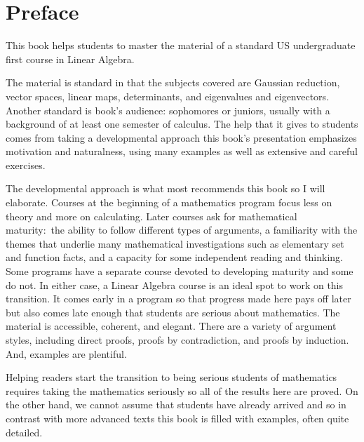 {\setlength{\parskip}{.7ex}  %
\chapter*{Preface}
This book helps students to master the material of a standard 
US undergraduate first course in Linear Algebra.

The material is standard in that the subjects covered are
Gaussian reduction, 
vector spaces, linear maps,
determinants, and eigenvalues and eigenvectors.
Another standard is book's audience:
sophomores or juniors, usually with a background 
of at least one semester of calculus. 
The help that it gives to students comes from taking a developmental 
approach\Dash 
this book's presentation emphasizes motivation and naturalness, 
using many examples as well as extensive and careful exercises.

The developmental approach is what most recommends this book
so I will elaborate.
Courses at the beginning of a mathematics program
focus less on theory and more on calculating.
Later courses
ask for mathematical maturity:~the ability to follow different 
types of arguments, 
a familiarity with
the themes that underlie many mathematical investigations such as
elementary set and function facts,
and a capacity for some independent reading and thinking.
Some programs have a separate course devoted to developing maturity and
some do not. 
In either case, a Linear Algebra course 
is an ideal spot to work on this transition.
It comes early in a program so that progress made here pays off later
but also comes late enough that
students are serious about mathematics.
The material is accessible, coherent, and elegant.
There are a variety of argument styles, including 
direct proofs, proofs by
contradiction, and proofs by induction.
And, examples are plentiful.

Helping readers start the transition to being serious students of 
mathematics
requires taking the mathematics seriously so
all of the results here are proved.
On the other hand, we cannot
assume that students have already arrived
and so 
in contrast with more advanced texts 
this book is filled with examples,
often quite detailed.

}
